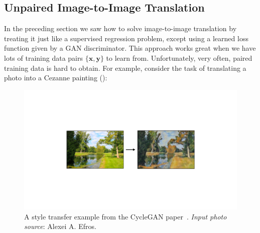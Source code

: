


\subsection{Unpaired Image-to-Image Translation}

In the preceding section we saw how to solve image-to-image translation by treating it just like a supervised regression problem, except using a learned loss function given by a GAN discriminator. This approach works great when we have lots of training data pairs $\{\mathbf{x}, \mathbf{y}\}$ to learn from. Unfortunately, very often, paired training data is hard to obtain. For example, consider the task of translating a photo into a Cezanne painting (\fig{\ref{fig:conditional_generative_models:cyclegan_teaser}}):
\begin{figure}[h!]
    \centerline{
        \includegraphics[width=0.6\linewidth]{./figures/conditional_generative_models/cyclegan_teaser.pdf}
    }
    \caption{A style transfer example from the CycleGAN paper~\cite{CycleGAN2017}. \textit{Input photo source}: Alexei A. Efros.}
    \label{fig:conditional_generative_models:cyclegan_teaser}
\end{figure}


